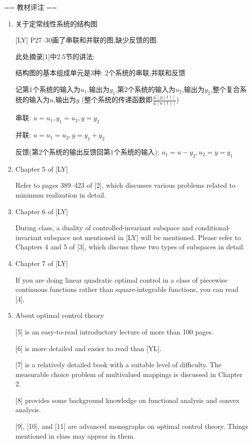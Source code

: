 == 教材评注 ==
\begin{enumerate}
\item 关于定常线性系统的结构图

[LY] P27--30画了串联和并联的图,缺少反馈的图.

此处摘录[1]中2.5节的讲法:

结构图的基本组成单元是3种: 2个系统的串联,并联和反馈

记第$1$个系统的输入为$u_1$,输出为$y_1$,第$2$个系统的输入为$u_2$,输出为$y_2$,整个复合系统的输入为$u$,输出为$y$ (整个系统的传递函数即$\frac{\mathcal{L}[y(t)]}{\mathcal{L}[u(t)]}$)

串联: $u=u_1,y_1=u_2,y=y_2$

并联: $u=u_1=u_2,y=y_1+y_2$

反馈(第$2$个系统的输出反馈回第$1$个系统的输入): $u_1=u-y_2,u_2=y=y_1$

\item Chapter 5 of [LY]

Refer to pages 389--423 of [2], which discusses various problems related to minimum realization in detail.

\item Chapter 6 of [LY]

During class, a duality of controlled-invariant subspace and conditional-invariant subspace not mentioned in [LY] will be mentioned. Please refer to Chapters 4 and 5 of [3], which discuss these two types of subspaces in detail.

\item Chapter 7 of [LY]

If you are doing linear quadratic optimal control in a class of piecewise continuous functions rather than square-integrable functions, you can read [4].

\item About optimal control theory

[5] is an easy-to-read introductory lecture of more than 100 pages.

[6] is more detailed and easier to read than [YL].

[7] is a relatively detailed book with a suitable level of difficulty. The measurable choice problem of multivalued mappings is discussed in Chapter 2.

[8] provides some background knowledge on functional analysis and convex analysis.

[9], [10], and [11] are advanced monographs on optimal control theory. Things mentioned in class may appear in them.
\end{enumerate}

